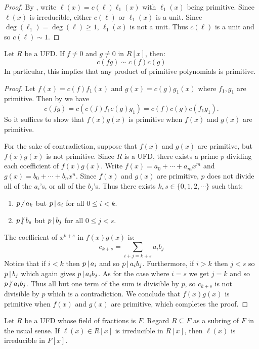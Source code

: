 \documentclass[11pt]{article}
\begin{document}
\begin{proof}
    By , write $\ell(x)=c(\ell)\ell_1(x)$ with $\ell_1(x)$ being primitive. Since $\ell(x)$ is irreducible, either $c(\ell)$ or $\ell_1(x)$ is a unit. Since $\deg(\ell_1)=\deg(\ell)\geq1$, $\ell_1(x)$ is not a unit. Thus $c(\ell)$ is a unit and so $c(\ell)\sim 1$.
    
\end{proof}

\begin{lemma}
    Let $R$ be a UFD. If $f\neq0$ and $g\neq0$ in $R[x]$, then:
    \[c(fg)\sim c(f)c(g)\]
    In particular, this implies that any product of primitive polynomials is primitive.
\end{lemma}

\begin{proof}
    Let $f(x)=c(f)f_1(x)$ and $g(x)=c(g)g_1(x)$ where $f_1,g_1$ are primitive. Then by  we have
    \[c(fg)=c(c(f)f_1c(g)g_1)=c(f)c(g)c(f_1g_1).\]
    So it suffices to show that $f(x)g(x)$ is primitive when $f(x)$ and $g(x)$ are primitive.

    For the sake of contradiction, suppose that $f(x)$ and $g(x)$ are primitive, but $f(x)g(x)$ is not primitive. Since $R$ is a UFD, there exists a prime $p$ dividing each coefficient of $f(x)g(x)$. Write $f(x)=a_0+\cdots+a_mx^m$ and $g(x)=b_0+\cdots+b_nx^n$. Since $f(x)$ and $g(x)$ are primitive, $p$ does not divide all of the $a_i$'s, or all of the $b_j$'s. Thus there exists $k,s\in\{0,1,2,\cdots\}$ such that:
    \begin{enumerate}
        \item $p\nd a_k$ but $p\,|\, a_i$ for all $0\leq i<k$.
        \item $p\nd b_s$ but $p\,|\, b_j$ for all $0\leq j<s$.
    \end{enumerate}
    The coefficient of $x^{k+s}$ in $f(x)g(x)$ is:
    \[c_{k+s}=\sum\limits_{i+j=k+s}a_ib_j\]
    Notice that if $i<k$ then $p\,|\, a_i$ and so $p\,|\, a_ib_j$. Furthermore, if $i>k$ then $j<s$ so $p\,|\, b_j$ which again gives $p\,|\, a_ib_j$. As for the case where $i=s$ we get $j=k$ and so $p\nd a_ib_j$. Thus all but one term of the sum is divisible by $p$, so $c_{k+s}$ is not divisible by $p$ which is a contradiction. We conclude that $f(x)g(x)$ is primitive when $f(x)$ and $g(x)$ are primitive, which completes the proof.
    
\end{proof}

\begin{theorem}
    Let $R$ be a UFD whose field of fractions is $F$. Regard $R\subseteq F$ as a subring of $F$ in the usual sense. If $\ell(x)\in R[x]$ is irreducible in $R[x]$, then $\ell(x)$ is irreducible in $F[x]$.
\end{theorem}
\end{document}
